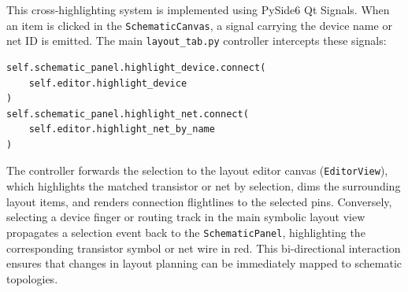 \noindent
This cross-highlighting system is implemented using PySide6 Qt Signals. When an item is clicked in the \texttt{SchematicCanvas}, a signal carrying the device name or net ID is emitted. The main \texttt{layout\_tab.py} controller intercepts these signals:
\begin{verbatim}
self.schematic_panel.highlight_device.connect(
    self.editor.highlight_device
)
self.schematic_panel.highlight_net.connect(
    self.editor.highlight_net_by_name
)
\end{verbatim}

\noindent
The controller forwards the selection to the layout editor canvas (\texttt{EditorView}), which highlights the matched transistor or net by selection, dims the surrounding layout items, and renders connection flightlines to the selected pins. Conversely, selecting a device finger or routing track in the main symbolic layout view propagates a selection event back to the \texttt{SchematicPanel}, highlighting the corresponding transistor symbol or net wire in red. This bi-directional interaction ensures that changes in layout planning can be immediately mapped to schematic topologies.

